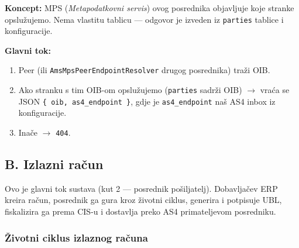 \documentclass[11pt,a4paper]{article}
\begin{document}
\textbf{Koncept:} MPS (\textit{Metapodatkovni servis}) ovog posrednika objavljuje koje stranke
opslužujemo. Nema vlastitu tablicu — odgovor je izveden iz \texttt{parties} tablice i
konfiguracije.

\textbf{Glavni tok:}
\begin{enumerate}[nosep]
  \item Peer (ili \texttt{AmsMpsPeerEndpointResolver} drugog posrednika) traži OIB.
  \item Ako stranku s tim OIB-om opslužujemo (\texttt{parties} sadrži OIB) $\rightarrow$ vraća se JSON
        \texttt{\{ oib, as4\_endpoint \}}, gdje je \texttt{as4\_endpoint} naš AS4 inbox iz konfiguracije.
  \item Inače $\rightarrow$ \texttt{404}.
\end{enumerate}

\subsection{B. Izlazni račun}\label{sec:izlazni}

Ovo je glavni tok sustava (kut 2 — posrednik pošiljatelj). Dobavljačev ERP kreira račun,
posrednik ga gura kroz životni ciklus, generira i potpisuje UBL, fiskalizira ga prema CIS-u
i dostavlja preko AS4 primateljevom posredniku.

\subsubsection*{Životni ciklus izlaznog računa}

\begin{center}
\end{center}
\end{document}
